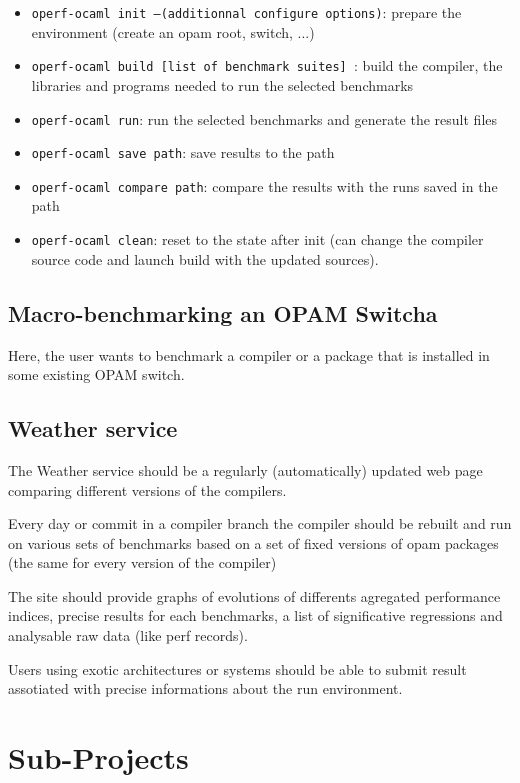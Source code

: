 \documentclass[11pt,a4paper]{article}
\begin{document}
\begin{itemize}
\item {\tt operf-ocaml init --(additionnal configure options)}: prepare the environment (create an opam root, switch, ...)
\item {\tt operf-ocaml build [list of benchmark suites] }: build the compiler, the libraries and programs needed to run the selected benchmarks
\item {\tt operf-ocaml run}: run the selected benchmarks and generate the result files
\item {\tt operf-ocaml save path}: save results to the path
\item {\tt operf-ocaml compare path}: compare the results with the runs saved in the path
\item {\tt operf-ocaml clean}: reset to the state after init (can change the compiler source code and launch build with the updated sources).
\end{itemize}

\subsection{Macro-benchmarking an OPAM Switcha}

Here, the user wants to benchmark a compiler or a package that is
installed in some existing OPAM switch.

\subsection{Weather service}

The Weather service should be a regularly (automatically) updated web
page comparing different versions of the compilers.

Every day or commit in a compiler branch the compiler should be
rebuilt and run on various sets of benchmarks based on a set of fixed
versions of opam packages (the same for every version of the compiler)

The site should provide graphs of evolutions of differents agregated
performance indices, precise results for each benchmarks, a list of
significative regressions and analysable raw data (like perf records).

Users using exotic architectures or systems should be able to submit
result assotiated with precise informations about the run environment.

\section{Sub-Projects}
\end{document}
